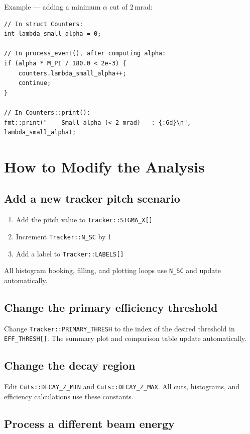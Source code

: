 \documentclass[11pt]{article}
\begin{document}
Example --- adding a minimum $\alpha$ cut of 2\,mrad:
\begin{lstlisting}
// In struct Counters:
int lambda_small_alpha = 0;

// In process_event(), after computing alpha:
if (alpha * M_PI / 180.0 < 2e-3) {
    counters.lambda_small_alpha++;
    continue;
}

// In Counters::print():
fmt::print("    Small alpha (< 2 mrad)   : {:6d}\n", lambda_small_alpha);
\end{lstlisting}

\section{How to Modify the Analysis}

\subsection{Add a new tracker pitch scenario}

\begin{enumerate}
  \item Add the pitch value to \texttt{Tracker::SIGMA\_X[]}
  \item Increment \texttt{Tracker::N\_SC} by 1
  \item Add a label to \texttt{Tracker::LABELS[]}
\end{enumerate}
All histogram booking, filling, and plotting loops use \texttt{N\_SC}
and update automatically.

\subsection{Change the primary efficiency threshold}

Change \texttt{Tracker::PRIMARY\_THRESH} to the index of the desired
threshold in \texttt{EFF\_THRESH[]}. The summary plot and comparison
table update automatically.

\subsection{Change the decay region}

Edit \texttt{Cuts::DECAY\_Z\_MIN} and \texttt{Cuts::DECAY\_Z\_MAX}.
All cuts, histograms, and efficiency calculations use these constants.

\subsection{Process a different beam energy}
\end{document}
